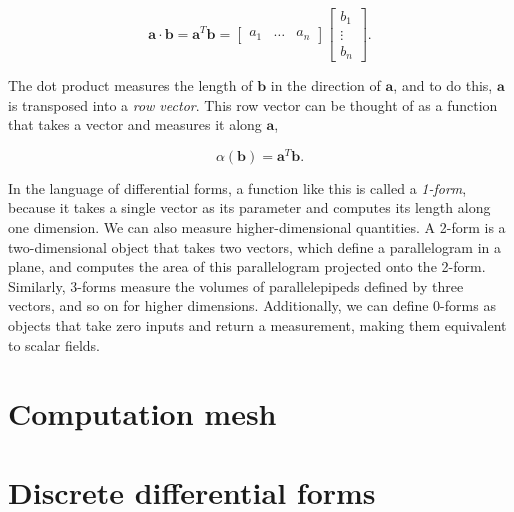 \documentclass[utf8,english]{gradu3}
\begin{document}
\[
  \mathbf{a} \cdot \mathbf{b} = \mathbf{a}^T \mathbf{b}
  = \begin{bmatrix}
    a_1 & \dots & a_n
  \end{bmatrix}
  \begin{bmatrix}
    b_1 \\ \vdots \\ b_n
  \end{bmatrix}.
\]

The dot product measures the length of $\mathbf{b}$ in the direction of $\mathbf{a}$,
and to do this, $\mathbf{a}$ is transposed into a \textit{row vector}.
This row vector can be thought of as a function
that takes a vector and measures it along $\mathbf{a}$,

\[
  \alpha(\mathbf{b}) = \mathbf{a}^T \mathbf{b}.
\]

In the language of differential forms,
a function like this is called a \textit{1-form},
because it takes a single vector as its parameter
and computes its length along one dimension.
We can also measure higher-dimensional quantities.
A 2-form is a two-dimensional object that takes two vectors,
which define a parallelogram in a plane,
and computes the area of this parallelogram
projected onto the 2-form.
Similarly, 3-forms measure the volumes of parallelepipeds
defined by three vectors, and so on for higher dimensions.
Additionally, we can define 0-forms
as objects that take zero inputs and return a measurement,
making them equivalent to scalar fields.


\section{Computation mesh}


\parencite{desbrun_discrete_2006}

\section{Discrete differential forms}

\end{document}
